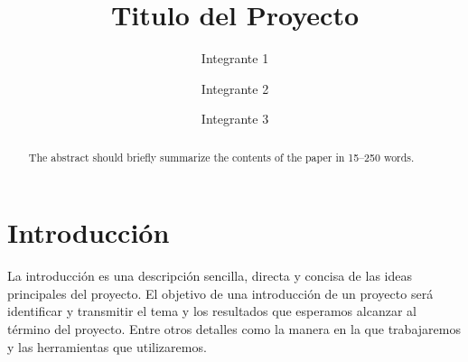 \documentclass[runningheads]{llncs}
\begin{document}
%
\title{Titulo del Proyecto}

%
\author{Integrante 1 \and
Integrante 2 \and
Integrante 3}
%
%
%
\maketitle 
\begin{abstract}
The abstract should briefly summarize the contents of the paper in
15--250 words.
\end{abstract}
%
\section{Introducción}
La introducción es una descripción sencilla, directa y concisa de las ideas principales del proyecto. El objetivo de una introducción de un proyecto será identificar y transmitir el tema y los resultados que esperamos alcanzar al término del proyecto. Entre otros detalles como la manera en la que trabajaremos y las herramientas que utilizaremos.
\end{document}
